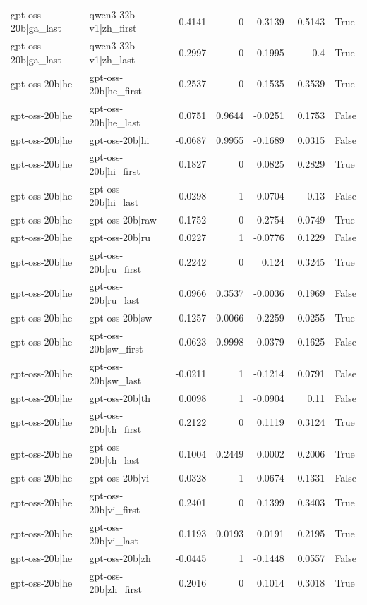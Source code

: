 \begin{table}
\begin{tabular}{l l r r r r l}
gpt-oss-20b|ga_last & qwen3-32b-v1|zh_first & 0.4141 & 0 & 0.3139 & 0.5143 & True \\
gpt-oss-20b|ga_last & qwen3-32b-v1|zh_last & 0.2997 & 0 & 0.1995 & 0.4 & True \\
gpt-oss-20b|he & gpt-oss-20b|he_first & 0.2537 & 0 & 0.1535 & 0.3539 & True \\
gpt-oss-20b|he & gpt-oss-20b|he_last & 0.0751 & 0.9644 & -0.0251 & 0.1753 & False \\
gpt-oss-20b|he & gpt-oss-20b|hi & -0.0687 & 0.9955 & -0.1689 & 0.0315 & False \\
gpt-oss-20b|he & gpt-oss-20b|hi_first & 0.1827 & 0 & 0.0825 & 0.2829 & True \\
gpt-oss-20b|he & gpt-oss-20b|hi_last & 0.0298 & 1 & -0.0704 & 0.13 & False \\
gpt-oss-20b|he & gpt-oss-20b|raw & -0.1752 & 0 & -0.2754 & -0.0749 & True \\
gpt-oss-20b|he & gpt-oss-20b|ru & 0.0227 & 1 & -0.0776 & 0.1229 & False \\
gpt-oss-20b|he & gpt-oss-20b|ru_first & 0.2242 & 0 & 0.124 & 0.3245 & True \\
gpt-oss-20b|he & gpt-oss-20b|ru_last & 0.0966 & 0.3537 & -0.0036 & 0.1969 & False \\
gpt-oss-20b|he & gpt-oss-20b|sw & -0.1257 & 0.0066 & -0.2259 & -0.0255 & True \\
gpt-oss-20b|he & gpt-oss-20b|sw_first & 0.0623 & 0.9998 & -0.0379 & 0.1625 & False \\
gpt-oss-20b|he & gpt-oss-20b|sw_last & -0.0211 & 1 & -0.1214 & 0.0791 & False \\
gpt-oss-20b|he & gpt-oss-20b|th & 0.0098 & 1 & -0.0904 & 0.11 & False \\
gpt-oss-20b|he & gpt-oss-20b|th_first & 0.2122 & 0 & 0.1119 & 0.3124 & True \\
gpt-oss-20b|he & gpt-oss-20b|th_last & 0.1004 & 0.2449 & 0.0002 & 0.2006 & True \\
gpt-oss-20b|he & gpt-oss-20b|vi & 0.0328 & 1 & -0.0674 & 0.1331 & False \\
gpt-oss-20b|he & gpt-oss-20b|vi_first & 0.2401 & 0 & 0.1399 & 0.3403 & True \\
gpt-oss-20b|he & gpt-oss-20b|vi_last & 0.1193 & 0.0193 & 0.0191 & 0.2195 & True \\
gpt-oss-20b|he & gpt-oss-20b|zh & -0.0445 & 1 & -0.1448 & 0.0557 & False \\
gpt-oss-20b|he & gpt-oss-20b|zh_first & 0.2016 & 0 & 0.1014 & 0.3018 & True \\

\end{tabular}
\end{table}
